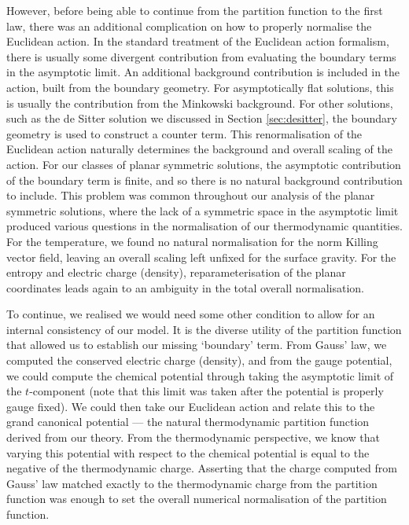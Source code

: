 However, before being able to continue from the partition function to the first law, there was an additional complication on how to properly normalise the Euclidean action. In the standard treatment of the Euclidean action formalism, there is usually some divergent contribution from evaluating the boundary terms in the asymptotic limit. An additional background contribution is included in the action, built from the boundary geometry. For asymptotically flat solutions, this is usually the contribution from the Minkowski background. For other solutions, such as the de Sitter solution we discussed in Section \ref{sec:desitter}, the boundary geometry is used to construct a counter term. This renormalisation of the Euclidean action naturally determines the background and overall scaling of the action. For our classes of planar symmetric solutions, the asymptotic contribution of the boundary term is finite, and so there is no natural background contribution to include. This problem was common throughout our analysis of the planar symmetric solutions, where the lack of a symmetric space in the asymptotic limit produced various questions in the normalisation of our thermodynamic quantities. For the temperature, we found no natural normalisation for the norm Killing vector field, leaving an overall scaling left unfixed for the surface gravity. For the entropy and electric charge (density), reparameterisation of the planar coordinates leads again to an ambiguity in the total overall normalisation.

To continue, we realised we would need some other condition to allow for an internal consistency of our model. It is the diverse utility of the partition function that allowed us to establish our missing `boundary' term. From Gauss' law, we computed the conserved electric charge (density), and from the gauge potential, we could compute the chemical potential through taking the asymptotic limit of the $t$-component (note that this limit was taken after the potential is properly gauge fixed). We could then take our Euclidean action and relate this to the grand canonical potential --- the natural thermodynamic partition function derived from our theory. From the thermodynamic perspective, we know that varying this potential with respect to the chemical potential is equal to the negative of the thermodynamic charge. Asserting that the charge computed from Gauss' law matched exactly to the thermodynamic charge from the partition function was enough to set the overall numerical normalisation of the partition function. 

